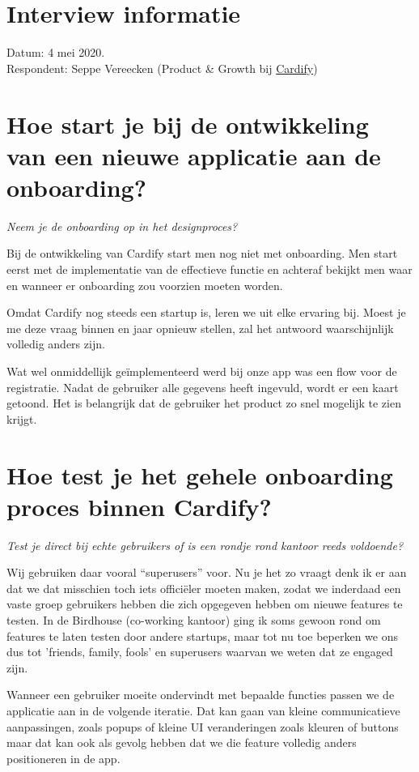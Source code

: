 \section{Interview informatie}

Datum: 4 mei 2020. \\
Respondent: Seppe Vereecken (Product \& Growth bij \href{https://getcardify.com/}{Cardify})

\section[Vraag 1]{Hoe start je bij de ontwikkeling van een nieuwe applicatie aan de onboarding?}

\textit{Neem je de onboarding op in het designproces?}

Bij de ontwikkeling van Cardify start men nog niet met onboarding. Men start eerst met de implementatie van de effectieve functie en  achteraf bekijkt men waar en wanneer er onboarding zou voorzien moeten worden.

Omdat Cardify nog steeds een startup is, leren we uit elke ervaring bij. Moest je me deze vraag binnen en jaar opnieuw stellen, zal het antwoord waarschijnlijk volledig anders zijn.

Wat wel onmiddellijk geïmplementeerd werd bij onze app was een flow voor de registratie. Nadat de gebruiker alle gegevens heeft ingevuld, wordt er een kaart getoond. Het is belangrijk dat de gebruiker het product zo snel mogelijk te zien krijgt.

\section[Vraag 2]{Hoe test je het gehele onboarding proces binnen Cardify?}

\textit{Test je direct bij echte gebruikers of is een rondje rond kantoor reeds voldoende?}

Wij gebruiken daar vooral ``superusers'' voor. Nu je het zo vraagt denk ik er aan dat we dat misschien toch iets officiëler moeten maken, zodat we inderdaad een vaste groep gebruikers hebben die zich opgegeven hebben om nieuwe features te testen. In de Birdhouse (co-working kantoor) ging ik soms gewoon rond om features te laten testen door andere startups, maar tot nu toe beperken we ons dus tot 'friends, family, fools' en superusers waarvan we weten dat ze engaged zijn.

Wanneer een gebruiker moeite ondervindt met bepaalde functies passen we de applicatie aan in de volgende iteratie. Dat kan gaan van kleine communicatieve aanpassingen, zoals popups of kleine UI veranderingen zoals kleuren of buttons maar dat kan ook als gevolg hebben dat we die feature volledig anders positioneren in de app.

